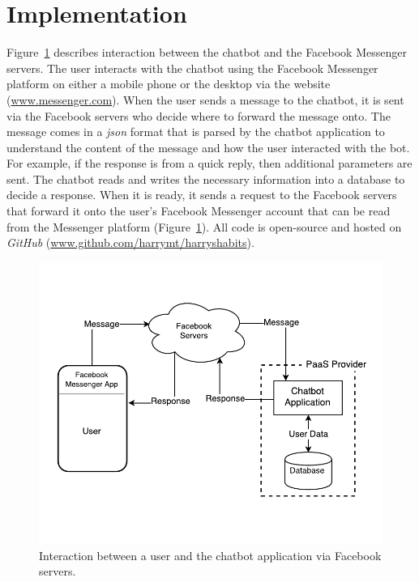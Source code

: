 
\section{Implementation}
Figure~\ref{fig:prototype_component_overview} describes interaction between the chatbot and the Facebook Messenger servers. The user interacts with the chatbot using the Facebook Messenger platform on either a mobile phone or the desktop via the website (\url{www.messenger.com}). When the user sends a message to the chatbot, it is sent via the Facebook servers who decide where to forward the message onto. The message comes in a \textit{json} format that is parsed by the chatbot application to understand the content of the message and how the user interacted with the bot. For example, if the response is from a quick reply, then additional parameters are sent. The chatbot reads and writes the necessary information into a database to decide a response. When it is ready, it sends a request to the Facebook servers that forward it onto the user's Facebook Messenger account that can be read from the Messenger platform (Figure~\ref{fig:prototype_component_overview}). All code is open-source and hosted on \textit{GitHub} (\url{www.github.com/harrymt/harryshabits}).

\begin{figure}[H]
    \centering
    \includegraphics[width=5.1in]{../resources/diagrams/chatbot-component-overview.pdf}
    \caption{Interaction between a user and the chatbot application via Facebook servers.}
    \label{fig:prototype_component_overview}
\end{figure}

